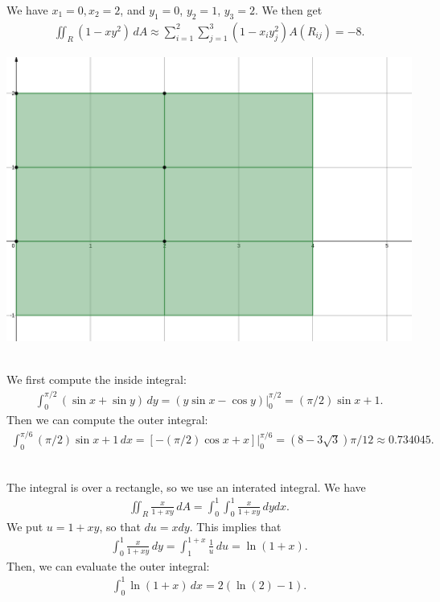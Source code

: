 \begin{enumerate}[label=(\alph*)]
		We have $x_1 = 0, x_2 = 2$, and $y_1 = 0$, $y_2 = 1$, $y_3 = 2$. We then get
		\begin{align*}
		\iint_R (1 - xy^2 ) \, dA \approx \sum_{i = 1}^2 \sum_{j =1}^3 (1 - x_i y_j^2) A(R_{ij}) = -8 .
		\end{align*}
	\begin{center}
		\includegraphics[scale=0.3]{section15-1_Prob2b.png}
		\end{center}
	\end{enumerate}
			
	\spc

	\\
	We first compute the inside integral:
		\begin{align*}
		\int_0^{\pi/2} (\sin x + \sin y) \, dy = (y \sin x - \cos y) \Big|_{0}^{\pi/2} = (\pi /2) \sin x + 1 .
		\end{align*}
	Then we can compute the outer integral:
		\begin{align*}
		\int_0^{\pi/6} (\pi/2) \sin x + 1 \, dx = [ - (\pi/2) \cos x + x] \Big|_{0}^{\pi/6} = (8 - 3 \sqrt{3}) \pi/12 \approx 0.734045 .
		\end{align*}

	\spc 

	\\
	The integral is over a rectangle, so we use an interated integral. We have
		\begin{align*}
		\iint_R \frac{x}{1 + xy} \, dA = \int_0^1 \int_0^1 \frac{x}{1+x y} \, dy dx .
		\end{align*}
	We put $u = 1 + xy$, so that $du = x dy$. This implies that
		\begin{align*}
		\int_0^1 \frac{x}{1 + xy} \, dy = \int_1^{1 + x} \frac{1}{u} \, du = \ln (1 + x) .
		\end{align*}
	Then, we can evaluate the outer integral:
		\begin{align*}
		\int_0^1 \ln (1 + x) \, dx = 2 ( \ln (2) - 1 ) .
		\end{align*}
	
